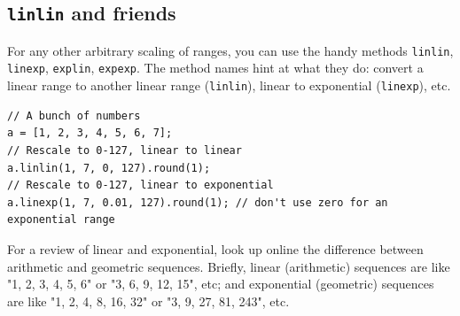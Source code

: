 \subsection{\texttt{linlin} and friends}

For any other arbitrary scaling of ranges, you can use the handy methods \texttt{linlin}, \texttt{linexp}, \texttt{explin}, \texttt{expexp}. The method names hint at what they do: convert a linear range to another linear range (\texttt{linlin}), linear to exponential (\texttt{linexp}), etc.

\begin{lstlisting}[style=SuperCollider-IDE, basicstyle=\scttfamily\footnotesize]
// A bunch of numbers
a = [1, 2, 3, 4, 5, 6, 7];
// Rescale to 0-127, linear to linear
a.linlin(1, 7, 0, 127).round(1);
// Rescale to 0-127, linear to exponential
a.linexp(1, 7, 0.01, 127).round(1); // don't use zero for an exponential range
\end{lstlisting}

For a review of linear and exponential, look up online the difference between arithmetic and geometric sequences. Briefly, linear (arithmetic) sequences are like "1, 2, 3, 4, 5, 6" or "3, 6, 9, 12, 15", etc; and exponential (geometric) sequences are like "1, 2, 4, 8, 16, 32" or "3, 9, 27, 81, 243", etc.